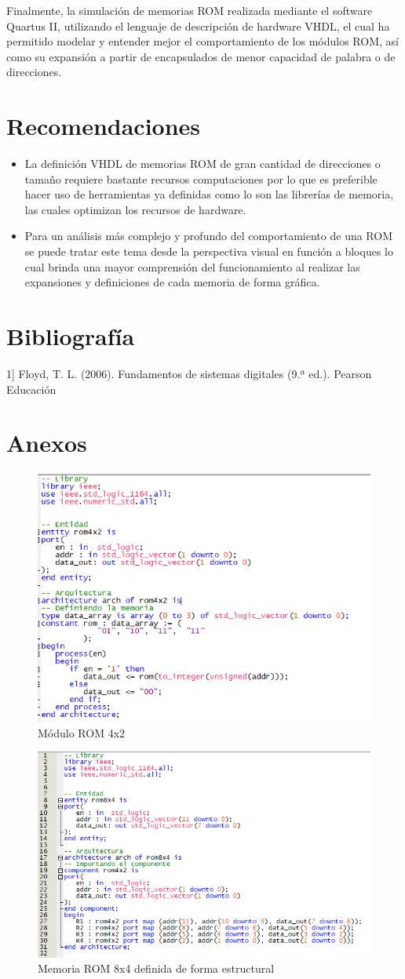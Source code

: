 \documentclass[stu, 10pt, floatsintext]{apa7}
\begin{document}
	Finalmente, la simulación de memorias ROM realizada mediante el software Quartus II, utilizando el lenguaje de descripción de hardware VHDL, el cual ha permitido modelar y entender mejor el comportamiento de los módulos ROM, así como su expansión a partir de encapsulados de menor capacidad de palabra o de direcciones.
	
	\section{Recomendaciones}
	\begin{itemize}
		\item La definición VHDL de memorias ROM de gran cantidad de direcciones o tamaño requiere bastante recursos computaciones por lo que es preferible hacer uso de herramientas ya definidas como lo son las librerías de memoria, las cuales optimizan los recursos de hardware.
		\item Para un análisis más complejo y profundo del comportamiento de una ROM se puede tratar este tema desde la perspectiva visual en función a bloques lo cual brinda una mayor comprensión del funcionamiento al realizar las expansiones y definiciones de cada memoria de forma gráfica.
	\end{itemize}
	
	\section{Bibliografía}
	1] Floyd, T. L. (2006). Fundamentos de sistemas digitales (9.ª ed.). Pearson Educación
	
	\newpage
	\section{Anexos}
	\begin{figure}
		\centering
		\includegraphics[width=0.7\linewidth]{media/rom4x2}
		\caption{Módulo ROM 4x2}
		\label{fig:rom4x2}
	\end{figure}
	
	\begin{figure}
		\centering
		\includegraphics[width=0.7\linewidth]{media/rom8x4}
		\caption{Memoria ROM 8x4 definida de forma estructural}
		\label{fig:rom8x4}
	\end{figure}
	
\end{document}
